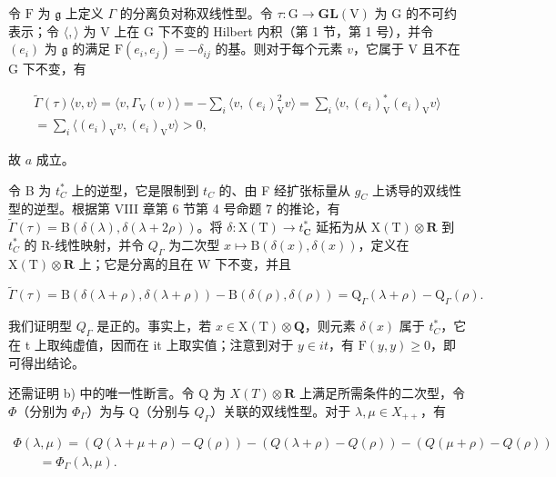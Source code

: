 令 \(\mathrm{F}\) 为 \(\mathfrak{g}\) 上定义 \(\Gamma\) 的分离负对称双线性型。令 \(\tau : \mathrm{G} \to \mathbf{GL}(\mathrm{V})\) 为 \(\mathrm{G}\) 的不可约表示；令 \(\langle , \rangle\) 为 \(\mathrm{V}\) 上在 \(\mathrm{G}\) 下不变的 Hilbert 内积（第 1 节，第 1 号），并令 \((e_i)\) 为 \(\mathfrak{g}\) 的满足 \(\mathrm{F}(e_i, e_j) = -\delta_{ij}\) 的基。则对于每个元素 \(v\)，它属于 \(\mathrm{V}\) 且不在 \(\mathrm{G}\) 下不变，有

\[
\begin{array}{c} \tilde {\Gamma} (\tau) \langle v, v \rangle = \langle v, \Gamma_ {\mathrm{V}} (v) \rangle = - \sum_ {i} \langle v, (e _ {i}) _ {\mathrm{V}} ^ {2} v \rangle = \sum_ {i} \langle v, (e _ {i}) _ {\mathrm{V}} ^ {*} (e _ {i}) _ {\mathrm{V}} v \rangle \\ = \sum_ {i} \langle (e _ {i}) _ {\mathrm{V}} v, (e _ {i}) _ {\mathrm{V}} v \rangle > 0, \end{array}
\]

故 \(a\) 成立。

令 B 为 \(t_{C}^{*}\) 上的逆型，它是限制到 \(t_{C}\) 的、由 F 经扩张标量从 \(g_{C}\) 上诱导的双线性型的逆型。根据第 VIII 章第 6 节第 4 号命题 7 的推论，有 \(\tilde{\Gamma}(\tau) = \mathrm{B}(\delta(\lambda), \delta(\lambda + 2\rho))\)。将 \(\delta : \mathrm{X(T)} \to t_{\mathbf{C}}^{*}\) 延拓为从 \(\mathrm{X(T)} \otimes \mathbf{R}\) 到 \(t_{C}^{*}\) 的 R-线性映射，并令 \(Q_{\Gamma}\) 为二次型 \(x \mapsto \mathrm{B}(\delta(x), \delta(x))\)，定义在 \(\mathrm{X(T)} \otimes \mathbf{R}\) 上；它是分离的且在 W 下不变，并且

\[
\tilde {\Gamma} (\tau) = \mathrm{B} (\delta (\lambda + \rho), \delta (\lambda + \rho)) - \mathrm{B} (\delta (\rho), \delta (\rho)) = \mathrm{Q} _ {\Gamma} (\lambda + \rho) - \mathrm{Q} _ {\Gamma} (\rho).
\]

我们证明型 \(Q_{\Gamma}\) 是正的。事实上，若 \(x \in \mathrm{X}(\mathrm{T}) \otimes \mathbf{Q}\)，则元素 \(\delta(x)\) 属于 \(t_{C}^{*}\)，它在 t 上取纯虚值，因而在 it 上取实值；注意到对于 \(y \in it\)，有 \(\mathrm{F}(y, y) \geq 0\)，即可得出结论。

还需证明 b) 中的唯一性断言。令 Q 为 \(X(T) \otimes \mathbf{R}\) 上满足所需条件的二次型，令 \(\Phi\)（分别为 \(\Phi_{\Gamma}\)）为与 Q（分别与 \(Q_{\Gamma}\)）关联的双线性型。对于 \(\lambda, \mu \in X_{++}\)，有

\[
\begin{array}{l} \Phi (\lambda , \mu) = (Q (\lambda + \mu + \rho) - Q (\rho)) - (Q (\lambda + \rho) - Q (\rho)) - (Q (\mu + \rho) - Q (\rho)) \\ \qquad = \Phi_ {\Gamma} (\lambda , \mu). \end{array}
\]

